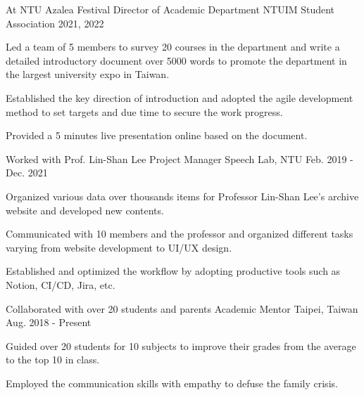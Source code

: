\begin{cventries}
  \cventry
    {At NTU Azalea Festival} %
    {Director of Academic Department} %
    {NTUIM Student Association} %
    {2021, 2022} %
    {
      \begin{cvitems} %
        \item {Led a team of 5 members to survey 20 courses in the department
            and write a detailed introductory document over 5000 words
            to promote the department in the largest university expo in Taiwan.}
        \item Established the key direction of introduction and adopted the agile
            development method to set targets and due time to secure the work progress.
        \item Provided a 5 minutes live presentation online based on the document.
      \end{cvitems}
    }


  \cventry
    {Worked with Prof. Lin-Shan Lee} %
    {Project Manager} %
    {Speech Lab, NTU} %
    {Feb. 2019 - Dec. 2021} %
    {
      \begin{cvitems} %
        \item {Organized various data over thousands items for Professor Lin-Shan Lee's archive website and developed new contents.}
        \item Communicated with 10 members and the professor and organized different tasks varying from website development
            to UI/UX design.
        \item {Established and optimized the workflow by adopting productive tools such as Notion, CI/CD, Jira, etc.}
      \end{cvitems}
    }

  \cventry
    {Collaborated with over 20 students and parents} %
    {Academic Mentor} %
    {Taipei, Taiwan} %
    {Aug. 2018 - Present} %
    {
      \begin{cvitems} %
      \item Guided over 20 students for 10 subjects to improve their
          grades from the average to the top 10 in class.
      \item Employed the communication skills with empathy to defuse 
          the family crisis.
      \end{cvitems}
    }

 

\end{cventries}
